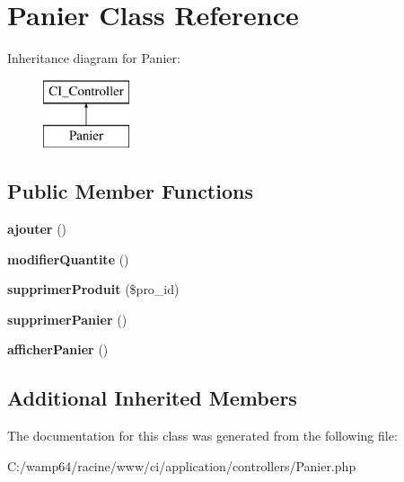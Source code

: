 \hypertarget{class_panier}{}\section{Panier Class Reference}
\label{class_panier}
Inheritance diagram for Panier\+:\begin{figure}[H]
\begin{center}
\leavevmode
\includegraphics[height=2.000000cm]{class_panier}
\end{center}
\end{figure}
\subsection*{Public Member Functions}
\begin{DoxyCompactItemize}
\item 
\mbox{\label{class_panier_a010033a745827c5fa54f32024eb56b03}} 
{\bfseries ajouter} ()
\item 
\mbox{\label{class_panier_a883465d8a2f8e25a941cf3944a642f5e}} 
{\bfseries modifier\+Quantite} ()
\item 
\mbox{\label{class_panier_ab0a32e2ad182542ef804fd5068d2d6f7}} 
{\bfseries supprimer\+Produit} (\$pro\+\_\+id)
\item 
\mbox{\label{class_panier_a5106283c2aff1dfa1dba0b1d28089d59}} 
{\bfseries supprimer\+Panier} ()
\item 
\mbox{\label{class_panier_a03bda26dbfab889d8fef06caf1c8335f}} 
{\bfseries afficher\+Panier} ()
\end{DoxyCompactItemize}
\subsection*{Additional Inherited Members}


The documentation for this class was generated from the following file\+:\begin{DoxyCompactItemize}
\item 
C\+:/wamp64/racine/www/ci/application/controllers/Panier.\+php\end{DoxyCompactItemize}
